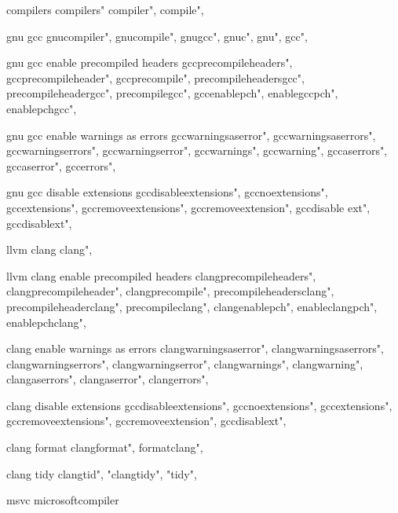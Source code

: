          compilers 
        compilers"
        compiler",
        compile",
        
         gnu gcc
        gnucompiler",
        gnucompile",
        gnugcc",
        gnuc",
        gnu",
        gcc",
        
         gnu gcc enable precompiled headers
        gccprecompileheaders",  
        gccprecompileheader",  
        gccprecompile",  
        precompileheadersgcc",  
        precompileheadergcc",  
        precompilegcc",  
        gccenablepch",  
        enablegccpch",  
        enablepchgcc",  
        
         gnu gcc enable warnings as errors
        gccwarningsaserror", 
        gccwarningsaserrors", 
        gccwarningserrors", 
        gccwarningserror", 
        gccwarnings", 
        gccwarning", 
        gccaserrors", 
        gccaserror", 
        gccerrors", 
        
         gnu gcc disable extensions 
        gccdisableextensions", 
        gccnoextensions", 
        gccextensions", 
        gccremoveextensions", 
        gccremoveextension", 
        gccdisable ext", 
        gccdisablext", 
        
         llvm clang 
        clang",  
        
         llvm clang enable precompiled headers 
        clangprecompileheaders",  
        clangprecompileheader",  
        clangprecompile",  
        precompileheadersclang",  
        precompileheaderclang",  
        precompileclang",  
        clangenablepch",  
        enableclangpch",  
        enablepchclang",  
        
         clang enable warnings as errors
        clangwarningsaserror", 
        clangwarningsaserrors", 
        clangwarningserrors", 
        clangwarningserror", 
        clangwarnings", 
        clangwarning", 
        clangaserrors", 
        clangaserror", 
        clangerrors", 
        
         clang disable extensions 
        gccdisableextensions", 
        gccnoextensions", 
        gccextensions", 
        gccremoveextensions", 
        gccremoveextension", 
        gccdisablext", 
        
         clang format 
        clangformat",
        formatclang",
        
         clang tidy 
        clangtid", "clangtidy", "tidy",  
        
         msvc  
         microsoftcompiler
        
